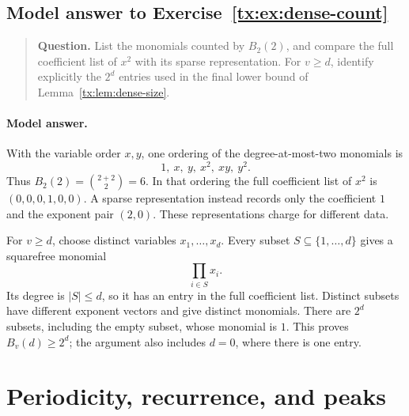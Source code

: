 \begin{samepage}

\subsection*{Model answer to Exercise~\ref{tx:ex:dense-count}}\label{tx:ans:dense-count}

\begin{quote}\small\textbf{Question.} List the monomials counted by $B_2(2)$, and compare the full coefficient
list of $x^2$ with its sparse representation. For $v\ge d$, identify
explicitly the $2^d$ entries used in the final lower bound of
Lemma~\ref{tx:lem:dense-size}.
\end{quote}

\paragraph{Model answer.}
With the variable order \(x,y\), one ordering of the degree-at-most-two
monomials is
\[
                       1,\ x,\ y,\ x^2,\ xy,\ y^2.
\]
Thus \(B_2(2)=\binom{2+2}{2}=6\). In that ordering the full coefficient
list of \(x^2\) is \((0,0,0,1,0,0)\). A sparse representation instead
records only the coefficient \(1\) and the exponent pair \((2,0)\).
These representations charge for different data.
\end{samepage}

For \(v\ge d\), choose distinct variables \(x_1,\ldots,x_d\).
Every subset \(S\subseteq\{1,\ldots,d\}\) gives a squarefree monomial
\[
                            \prod_{i\in S}x_i.
\]
Its degree is \(|S|\le d\), so it has an entry in the full coefficient
list. Distinct subsets have different exponent vectors and give
distinct monomials. There are \(2^d\) subsets, including the empty
subset, whose monomial is \(1\). This proves \(B_v(d)\ge2^d\);
the argument also includes \(d=0\), where there is one entry.


\par


\section{Periodicity, recurrence, and peaks}

